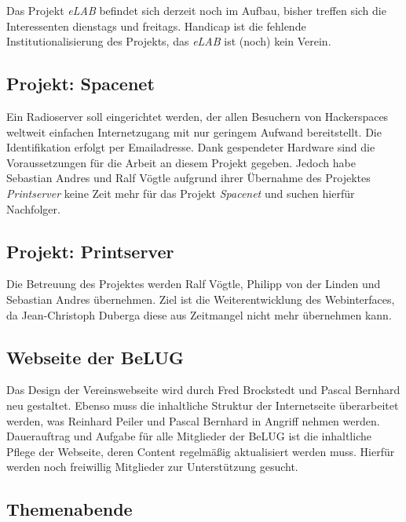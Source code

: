 \documentclass[11pt,a4paper,ngerman]{article}
\begin{document}
Das Projekt \emph{eLAB} befindet sich derzeit noch im Aufbau, bisher treffen 
sich die Interessenten dienstags und freitags. Handicap ist die fehlende 
Institutionalisierung des Projekts, das \emph{eLAB} ist (noch) kein Verein.


  \subsection{Projekt: Spacenet}

Ein Radioserver soll eingerichtet werden, der allen Besuchern von Hackerspaces 
weltweit einfachen Internetzugang mit nur geringem Aufwand bereitstellt. Die 
Identifikation erfolgt per Emailadresse. Dank gespendeter Hardware sind die 
Voraussetzungen für die Arbeit an diesem Projekt gegeben. Jedoch habe Sebastian 
Andres und Ralf Vögtle aufgrund ihrer Übernahme des Projektes 
\emph{Printserver} keine Zeit mehr für das Projekt \emph{Spacenet} und suchen 
hierfür Nachfolger.



  \subsection{Projekt: Printserver}

Die Betreuung des Projektes werden Ralf Vögtle, Philipp von der Linden und 
Sebastian Andres übernehmen. Ziel ist die Weiterentwicklung des Webinterfaces, 
da Jean-Christoph Duberga diese aus Zeitmangel nicht mehr übernehmen kann.  
  
  
  
  \subsection{Webseite der BeLUG}
  
Das Design der Vereinswebseite wird durch Fred Brockstedt und Pascal Bernhard 
neu gestaltet. Ebenso muss die inhaltliche Struktur der Internetseite 
überarbeitet werden, was Reinhard Peiler und Pascal Bernhard in Angriff nehmen 
werden. Dauerauftrag und Aufgabe für alle Mitglieder der BeLUG ist die 
inhaltliche Pflege der Webseite, deren Content regelmäßig aktualisiert werden 
muss. Hierfür werden noch freiwillig Mitglieder zur Unterstützung gesucht. 
  
  

  \subsection{Themenabende}
\end{document}
